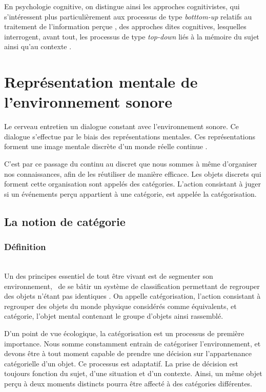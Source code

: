 En psychologie cognitive, on distingue ainsi les approches cognitivistes, qui s'intéressent plus particulièrement aux processus de type \emph{botttom-up} relatifs au traitement de l'information perçue , des approches dites cognitives, lesquelles interrogent, avant tout, les processus de type \emph{top-down} liés à la mémoire du sujet ainsi qu'au contexte \citep[p. ??]{guastavino_etude_2003}.

\section{Représentation mentale de l'environnement sonore}

Le cerveau entretien un dialogue constant avec l'environnement sonore. Ce dialogue s'effectue par le biais des représentations mentales. Ces représentations forment une image mentale discrète d'un monde réelle continue \citep{houde1998vocabulaire}. 

C'est par ce passage du continu au discret que nous sommes à même d'organiser nos connaissances, afin de les réutiliser de manière efficace. Les objets discrets qui forment cette organisation sont appelés des catégories. L'action consistant à juger si un événements perçu appartient à une catégorie, est appelée la catégorisation.

\subsection{La notion de catégorie}

\subsubsection{Définition}

 \\

Un des principes essentiel de tout être vivant est de segmenter son environnement, \ie~de se bâtir un système de classification permettant de regrouper des objets n'étant pas identiques \citep[p. 1]{rosch1978cognition}. On appelle catégorisation, l'action consistant à regrouper des objets du monde physique considérés comme équivalents, et catégorie, l'objet mental contenant le groupe d'objets ainsi rassemblé. 
 
D'un point de vue écologique, la catégorisation est un processus de première importance. Nous somme constamment entrain de catégoriser l'environnement, et devons être à tout moment capable de prendre une décision sur l'appartenance catégorielle d'un objet. Ce processus est adaptatif. La prise de décision est toujours fonction du sujet, d'une situation et d'un contexte. Ainsi, un même objet perçu à deux moments distincts pourra être affecté à des catégories différentes.

